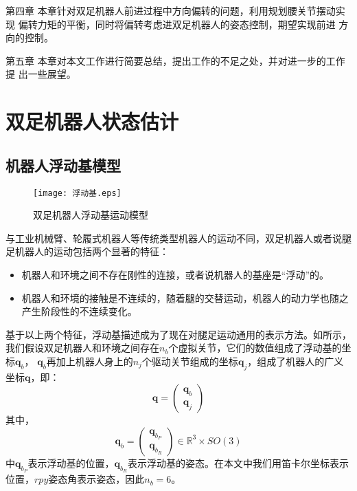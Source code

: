 第四章 本章针对双足机器人前进过程中方向偏转的问题，利用规划腰关节摆动实现
偏转力矩的平衡，同时将偏转考虑进双足机器人的姿态控制，期望实现前进
方向的控制。

第五章 本章对本文工作进行简要总结，提出工作的不足之处，并对进一步的工作提
出一些展望。
\chapter{双足机器人状态估计}
\section{机器人浮动基模型}
\begin{figure}[htbp]
    \centering
    \texttt{[image: 浮动基.eps]}
    \caption{\label{fig:floating_base}双足机器人浮动基运动模型}
\end{figure}

与工业机械臂、轮履式机器人等传统类型机器人的运动不同，双足机器人或者说腿足机器人的运动包括两个显著的特征：
\begin{itemize}
    \item 机器人和环境之间不存在刚性的连接，或者说机器人的基座是“浮动”的。
    \item 机器人和环境的接触是不连续的，随着腿的交替运动，机器人的动力学也随之产生阶段性的不连续变化。
\end{itemize}

基于以上两个特征，浮动基描述成为了现在对腿足运动通用的表示方法。如所示，我们假设双足机器人和环境之间存在$n_b$个虚拟关节，它们的数值组成了浮动基的坐标$\boldsymbol{q}_b$，
$\boldsymbol{q}_b$再加上机器人身上的$n_j$个驱动关节组成的坐标$\boldsymbol{q}_j$，组成了机器人的广义坐标$\boldsymbol{q}$，即：
\begin{equation}
    \label{equ:general_coor}
    \boldsymbol{q}=\left(\begin{array}{c}
        \boldsymbol{q}_b \\
        \boldsymbol{q}_j
        \end{array}\right)
\end{equation}
其中，
\begin{equation}
    \label{equ:floating_coor}
    \boldsymbol{q}_b=\left(\begin{array}{c}
        \boldsymbol{q}_{b_P} \\
        \boldsymbol{q}_{b_R}
        \end{array}\right) \in \mathbb{R}^3 \times SO(3)
\end{equation}
中$ \boldsymbol{q}_{b_P}$表示浮动基的位置，$\boldsymbol{q}_{b_R}$表示浮动基的姿态。在本文中我们用笛卡尔坐标表示位置，$rpy$姿态角表示姿态，因此$n_b = 6$。

